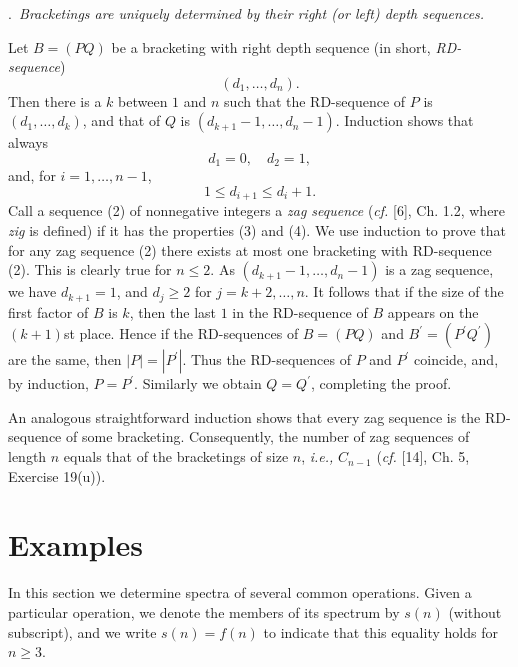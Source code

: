 \documentclass[a4paper,reqno]{amsart}\usepackage{amssymb,latexsym}
\theoremstyle{definition}
\theoremstyle{remark}
\numberwithin{equation}{section}
\numberwithin{theorem}{section}
\begin{document}
\bigskip

.\textit{\ Bracketings are uniquely determined by their right (or
left) depth sequences.}

\smallskip

Let $B=(PQ)$ be a bracketing with right depth sequence (in short,
\textit{RD-sequence})\begin{equation}
(d_{1},\ldots,d_{n}). \tag{2}\end{equation}
Then there is a $k$ between $1$ and $n$ such that the RD-sequence of $P$ is
$(d_{1},\ldots,d_{k})$, and that of $Q$ is $(d_{k+1}-1,\ldots,d_{n}-1)$.
Induction shows that always\begin{equation}
d_{1}=0,\quad d_{2}=1, \tag{3}\end{equation}
and, for $i=1,\ldots,n-1$,
\begin{equation}
1\leq d_{i+1}\leq d_{i}+1. \tag{4}\end{equation}
Call a sequence (2) of nonnegative integers a \textit{zag sequence}
(\textit{cf.} [6], Ch. 1.2, where \textit{zig} is defined) if it has the
properties (3) and (4). We use induction to prove that for any zag sequence
(2) there exists at most one bracketing with RD-sequence (2). This is clearly
true for $n\leq2$. As $(d_{k+1}-1,\ldots,d_{n}-1)$ is a zag sequence, we have
$d_{k+1}=1$, and $d_{j}\geq2$ for $j=k+2,\ldots,n$. It follows that if the
size of the first factor of $B$ is $k$, then the last $1$ in the RD-sequence
of $B$ appears on the $(k+1)$st place. Hence if the RD-sequences of $B=(PQ)$
and $B^{\prime}=(P^{\prime}Q^{\prime})$ are the same, then $|P|=|P^{\prime}|$.
Thus the RD-sequences of $P$ and $P^{\prime}$ coincide, and, by induction,
$P=P^{\prime}$. Similarly we obtain $Q=Q^{\prime}$, completing the proof.

An analogous straightforward induction shows that every zag sequence is the
RD-sequence of some bracketing. Consequently, the number of zag sequences of
length $n$ equals that of the bracketings of size $n$, \textit{i.e.,}
$C_{n-1}$ (\textit{cf.} [14], Ch. 5, Exercise 19(u)).

\section{Examples}

In this section we determine spectra of several common operations. Given a
particular operation, we denote the members of its spectrum by $s(n)$ (without
subscript), and we write $s(n)=f(n)$ to indicate that this equality holds for
$n\geq3$.
\end{document}
